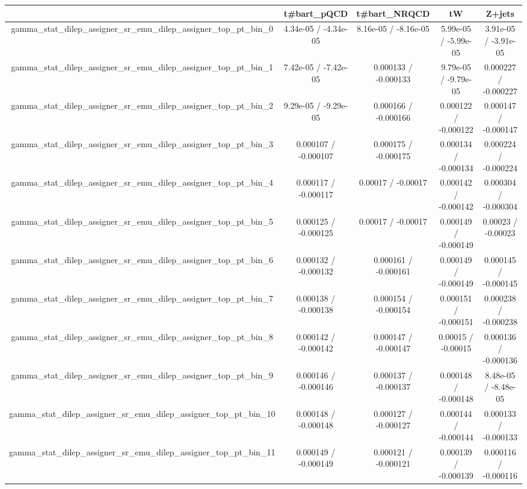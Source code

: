 \documentclass[10pt]{article}
\begin{document}
\begin{table}[htbp]
\begin{center}
\begin{tabular}{|c|c|c|c|c|}
\hline 
      & t#bar{t}_{pQCD}      & t#bar{t}_{NRQCD}      & tW      & Z+jets \\ 
\hline 
  gamma_stat_dilep_assigner_sr_emu_dilep_assigner_top_pt_bin_0 & 4.34e-05 / -4.34e-05 & 8.16e-05 / -8.16e-05 & 5.99e-05 / -5.99e-05 & 3.91e-05 / -3.91e-05 \\ 
  gamma_stat_dilep_assigner_sr_emu_dilep_assigner_top_pt_bin_1 & 7.42e-05 / -7.42e-05 & 0.000133 / -0.000133 & 9.79e-05 / -9.79e-05 & 0.000227 / -0.000227 \\ 
  gamma_stat_dilep_assigner_sr_emu_dilep_assigner_top_pt_bin_2 & 9.29e-05 / -9.29e-05 & 0.000166 / -0.000166 & 0.000122 / -0.000122 & 0.000147 / -0.000147 \\ 
  gamma_stat_dilep_assigner_sr_emu_dilep_assigner_top_pt_bin_3 & 0.000107 / -0.000107 & 0.000175 / -0.000175 & 0.000134 / -0.000134 & 0.000224 / -0.000224 \\ 
  gamma_stat_dilep_assigner_sr_emu_dilep_assigner_top_pt_bin_4 & 0.000117 / -0.000117 & 0.00017 / -0.00017 & 0.000142 / -0.000142 & 0.000304 / -0.000304 \\ 
  gamma_stat_dilep_assigner_sr_emu_dilep_assigner_top_pt_bin_5 & 0.000125 / -0.000125 & 0.00017 / -0.00017 & 0.000149 / -0.000149 & 0.00023 / -0.00023 \\ 
  gamma_stat_dilep_assigner_sr_emu_dilep_assigner_top_pt_bin_6 & 0.000132 / -0.000132 & 0.000161 / -0.000161 & 0.000149 / -0.000149 & 0.000145 / -0.000145 \\ 
  gamma_stat_dilep_assigner_sr_emu_dilep_assigner_top_pt_bin_7 & 0.000138 / -0.000138 & 0.000154 / -0.000154 & 0.000151 / -0.000151 & 0.000238 / -0.000238 \\ 
  gamma_stat_dilep_assigner_sr_emu_dilep_assigner_top_pt_bin_8 & 0.000142 / -0.000142 & 0.000147 / -0.000147 & 0.00015 / -0.00015 & 0.000136 / -0.000136 \\ 
  gamma_stat_dilep_assigner_sr_emu_dilep_assigner_top_pt_bin_9 & 0.000146 / -0.000146 & 0.000137 / -0.000137 & 0.000148 / -0.000148 & 8.48e-05 / -8.48e-05 \\ 
  gamma_stat_dilep_assigner_sr_emu_dilep_assigner_top_pt_bin_10 & 0.000148 / -0.000148 & 0.000127 / -0.000127 & 0.000144 / -0.000144 & 0.000133 / -0.000133 \\ 
  gamma_stat_dilep_assigner_sr_emu_dilep_assigner_top_pt_bin_11 & 0.000149 / -0.000149 & 0.000121 / -0.000121 & 0.000139 / -0.000139 & 0.000116 / -0.000116 \\ 

\end{tabular}
\end{center}
\end{table}
\end{document}
